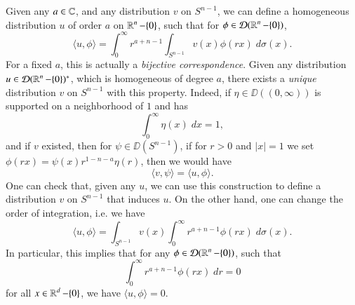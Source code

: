 Given any $a \in \operatorname{\mathbb{C}}$, and any distribution $v$ on $S^{n-1}$, we can define a homogeneous distribution $u$ of order $a$ on $\operatorname{\mathbb{R}}^n - \{ 0 \}$, such that for $\phi \in \operatorname{\mathcal{D}}(\operatorname{\mathbb{R}}^n - \{ 0 \})$,
%
\[ \langle u, \phi \rangle = \int_0^\infty r^{a+n-1} \int_{S^{n-1}} v(x) \phi(rx)\; d\sigma(x). \]
%
For a fixed $a$, this is actually a \emph{bijective correspondence}. Given any distribution $u \in \operatorname{\mathcal{D}}(\operatorname{\mathbb{R}}^n - \{ 0 \})^*$, which is homogeneous of degree $a$, there exists a \emph{unique} distribution $v$ on $S^{n-1}$ with this property. Indeed, if $\eta \in \DD((0,\infty))$ is supported on a neighborhood of $1$ and has
%
\[ \int_0^\infty \eta(x)\; dx = 1, \]
%
and if $v$ existed, then for $\psi \in \DD(S^{n-1})$, if for $r > 0$ and $|x| = 1$ we set $\phi(rx) = \psi(x) r^{1 - n - a} \eta(r)$, then we would have
%
\[ \langle v, \psi \rangle = \langle u, \phi \rangle. \]
%
One can check that, given any $u$, we can use this construction to define a distribution $v$ on $S^{n-1}$ that induces $u$. On the other hand, one can change the order of integration, i.e. we have
%
\[ \langle u, \phi \rangle = \int_{S^{n-1}} v(x) \int_0^\infty r^{a+n-1} \phi(rx)\; d\sigma(x). \]
%
In particular, this implies that for any $\phi \in \operatorname{\mathcal{D}}(\operatorname{\mathbb{R}}^n - \{ 0 \})$, such that
%
\[ \int_0^\infty r^{a + n - 1} \phi(rx)\; dr = 0 \]
%
for all $x \in \operatorname{\mathbb{R}}^d - \{ 0 \}$, we have $\langle u, \phi \rangle = 0$.


